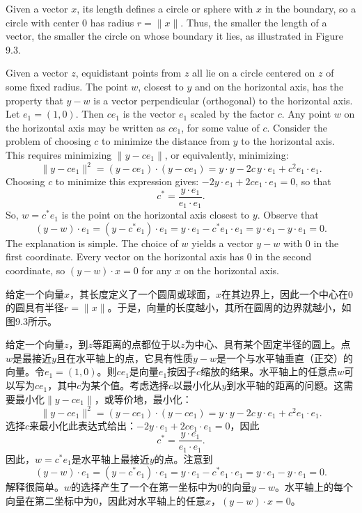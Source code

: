 \begin{original}
Given a vector $x$, its length defines a circle or sphere with $x$ in the boundary, so a circle with center 0 has radius $r = \|x\|$. Thus, the smaller the length of a vector, the smaller the circle on whose boundary it lies, as illustrated in Figure 9.3.

Given a vector $z$, equidistant points from $z$ all lie on a circle centered on $z$ of some fixed radius. The point $w$, closest to $y$ and on the horizontal axis, has the property that $y - w$ is a vector perpendicular (orthogonal) to the horizontal axis. Let $e_1 = (1, 0)$. Then $c e_1$ is the vector $e_1$ scaled by the factor $c$. Any point $w$ on the horizontal axis may be written as $c e_1$, for some value of $c$. Consider the problem of choosing $c$ to minimize the distance from $y$ to the horizontal axis. This requires minimizing $\|y - c e_1\|$, or equivalently, minimizing:
\[
\|y - c e_1\|^2 = (y - c e_1) \cdot (y - c e_1) = y \cdot y - 2c\, y \cdot e_1 + c^2 e_1 \cdot e_1.
\]
Choosing $c$ to minimize this expression gives: $-2y \cdot e_1 + 2c e_1 \cdot e_1 = 0$, so that
\[
c^* = \frac{y \cdot e_1}{e_1 \cdot e_1}.
\]
So, $w = c^* e_1$ is the point on the horizontal axis closest to $y$. Observe that
\[
(y - w) \cdot e_1 = (y - c^* e_1) \cdot e_1 = y \cdot e_1 - c^* e_1 \cdot e_1 = y \cdot e_1 - y \cdot e_1 = 0.
\]
The explanation is simple. The choice of $w$ yields a vector $y - w$ with 0 in the first coordinate. Every vector on the horizontal axis has 0 in the second coordinate, so $(y - w) \cdot x = 0$ for any $x$ on the horizontal axis.
\end{original}
\begin{translation}
给定一个向量$x$，其长度定义了一个圆周或球面，$x$在其边界上，因此一个中心在0的圆具有半径$r = \|x\|$。于是，向量的长度越小，其所在圆周的边界就越小，如图9.3所示。

给定一个向量$z$，到$z$等距离的点都位于以$z$为中心、具有某个固定半径的圆上。点$w$是最接近$y$且在水平轴上的点，它具有性质$y - w$是一个与水平轴垂直（正交）的向量。令$e_1 = (1, 0)$。则$c e_1$是向量$e_1$按因子$c$缩放的结果。水平轴上的任意点$w$可以写为$c e_1$，其中$c$为某个值。考虑选择$c$以最小化从$y$到水平轴的距离的问题。这需要最小化$\|y - c e_1\|$，或等价地，最小化：
\[
\|y - c e_1\|^2 = (y - c e_1) \cdot (y - c e_1) = y \cdot y - 2c\, y \cdot e_1 + c^2 e_1 \cdot e_1.
\]
选择$c$来最小化此表达式给出：$-2y \cdot e_1 + 2c e_1 \cdot e_1 = 0$，因此
\[
c^* = \frac{y \cdot e_1}{e_1 \cdot e_1}.
\]
因此，$w = c^* e_1$是水平轴上最接近$y$的点。注意到
\[
(y - w) \cdot e_1 = (y - c^* e_1) \cdot e_1 = y \cdot e_1 - c^* e_1 \cdot e_1 = y \cdot e_1 - y \cdot e_1 = 0.
\]
解释很简单。$w$的选择产生了一个在第一坐标中为0的向量$y - w$。水平轴上的每个向量在第二坐标中为0，因此对水平轴上的任意$x$，$(y - w) \cdot x = 0$。
\end{translation}


